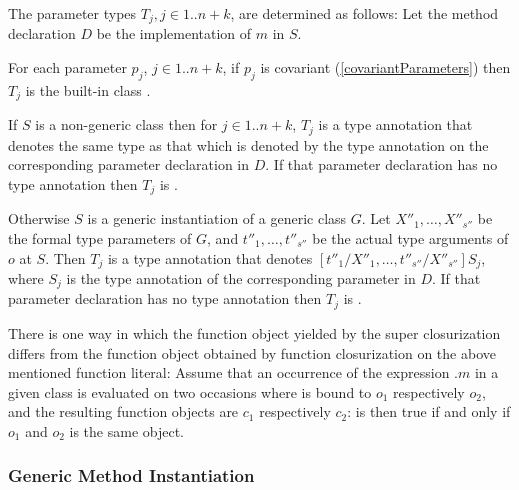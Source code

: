\documentclass[makeidx]{article}
\begin{document}
{\LMHash{}%
The parameter types $T_j, j \in 1 .. n+k$, are determined as follows:
Let the method declaration $D$ be the implementation of $m$ in $S$.

\LMHash{}%
For each parameter $p_j$, $j \in 1 .. n+k$, if $p_j$ is covariant
(\ref{covariantParameters})
then $T_j$ is the built-in class .


\LMHash{}%
If $S$ is a non-generic class then for $j \in 1 .. n+k$,
$T_j$ is a type annotation that denotes the same type as that
which is denoted by the type annotation on
the corresponding parameter declaration in $D$.
If that parameter declaration has no type annotation then $T_j$ is \DYNAMIC.

\LMHash{}%
Otherwise $S$ is a generic instantiation of a generic class $G$.
Let $X''_1, \ldots, X''_{s''}$ be the formal type parameters of $G$,
and $t''_1, \ldots, t''_{s''}$ be the actual type arguments of $o$ at $S$.
Then $T_j$ is a type annotation that denotes
$[t''_1/X''_1, \ldots, t''_{s''}/X''_{s''}]S_j$,
where $S_j$ is the type annotation of the corresponding parameter in $D$.
If that parameter declaration has no type annotation then $T_j$ is \DYNAMIC.

\LMHash{}%
There is one way in which
the function object yielded by the super closurization differs from
the function object obtained by function closurization on
the above mentioned function literal:
Assume that an occurrence of the expression \SUPER.$m$ in a given class
is evaluated on two occasions where \THIS{}
is bound to $o_1$ respectively $o_2$,
and the resulting function objects are $c_1$ respectively $c_2$:
 is then true
if and only if $o_1$ and $o_2$ is the same object.


\subsubsection{Generic Method Instantiation}


}
\end{document}
